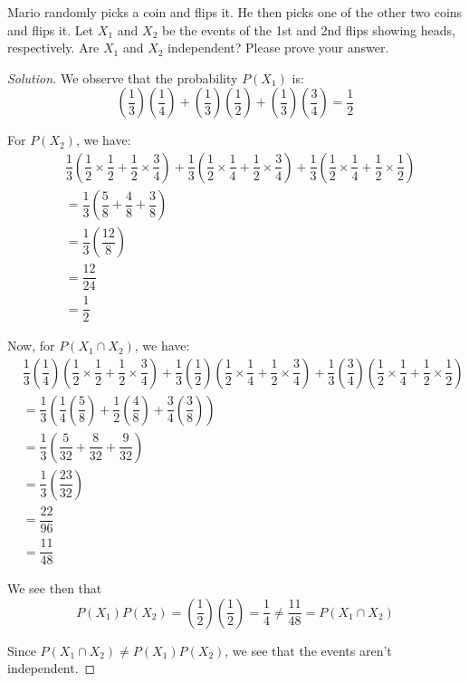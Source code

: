 \documentclass{article}
\newenvironment{solution}{\begin{proof}[Solution]}{\end{proof}}
\begin{document}
\begin{hw}
	Mario randomly picks a coin and flips it. He then picks one of the
	other two coins and flips it. Let $X_1$ and $X_2$ be the events of the 1st
	and 2nd flips showing heads, respectively. Are $X_1$ and $X_2$ independent?
	Please prove your answer.
\end{hw}
\begin{solution}
	We observe that the probability $P(X_{1})$ is:
	\begin{equation*}
		\left( \dfrac{1}{3} \right)\left( \dfrac{1}{4} \right) + \left( \dfrac{1}{3} \right)\left( \dfrac{1}{2} \right) + \left( \dfrac{1}{3} \right)\left( \dfrac{3}{4} \right) = \dfrac{1}{2}
	\end{equation*}

	For $P(X_{2})$, we have:
	\begin{align*}
		&\dfrac{1}{3}\left( \dfrac{1}{2}\times\dfrac{1}{2} + \dfrac{1}{2}\times\dfrac{3}{4}\right) + \dfrac{1}{3}\left( \dfrac{1}{2}\times\dfrac{1}{4} + \dfrac{1}{2}\times\dfrac{3}{4}\right) + \dfrac{1}{3}\left( \dfrac{1}{2}\times\dfrac{1}{4} + \dfrac{1}{2}\times\dfrac{1}{2}\right) \\ 
		&= \dfrac{1}{3}\left( \dfrac{5}{8} + \dfrac{4}{8} + \dfrac{3}{8} \right) \\
		&= \dfrac{1}{3}\left( \dfrac{12}{8} \right) \\
		&= \dfrac{12}{24} \\
		&= \dfrac{1}{2}
	\end{align*}

	Now, for $P(X_{1} \cap X_{2})$, we have:
	\begin{align*}
		&\dfrac{1}{3}\left( \dfrac{1}{4} \right)\left( \dfrac{1}{2}\times\dfrac{1}{2} + \dfrac{1}{2}\times\dfrac{3}{4} \right) + \dfrac{1}{3}\left( \dfrac{1}{2} \right)\left( \dfrac{1}{2}\times\dfrac{1}{4} + \dfrac{1}{2}\times\dfrac{3}{4}\right) + \dfrac{1}{3}\left( \dfrac{3}{4} \right)\left( \dfrac{1}{2}\times\dfrac{1}{4} + \dfrac{1}{2}\times\dfrac{1}{2} \right) \\
		&= \dfrac{1}{3}\left( \dfrac{1}{4}\left( \dfrac{5}{8} \right) + \dfrac{1}{2}\left( \dfrac{4}{8} \right) + \dfrac{3}{4}\left( \dfrac{3}{8} \right)\right) \\
		&= \dfrac{1}{3}\left( \dfrac{5}{32}  + \dfrac{8}{32} + \dfrac{9}{32}\right) \\
		&= \dfrac{1}{3}\left( \dfrac{23}{32} \right) \\
		&= \dfrac{22}{96} \\
		&= \dfrac{11}{48}
	\end{align*}

	We see then that
	\begin{equation*}
		P(X_{1})P(X_{2}) = \left( \dfrac{1}{2} \right)\left( \dfrac{1}{2} \right) = \dfrac{1}{4} \not= \dfrac{11}{48} = P(X_{1} \cap X_{2})
	\end{equation*}

	Since $P(X_{1} \cap X_{2}) \not= P(X_{1})P(X_{2})$, we see that the events aren't independent.
\end{solution}
\end{document}
